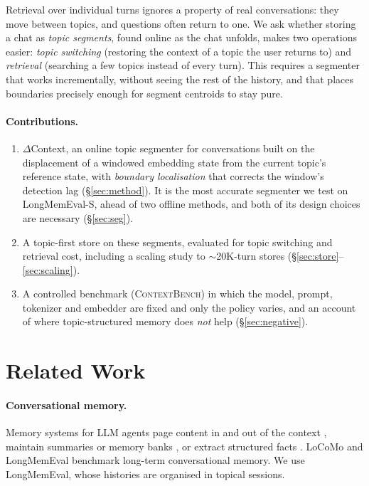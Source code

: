 \documentclass[11pt]{article}
\newcommand{\dc}{$\Delta$Context}
\begin{document}
Retrieval over individual turns ignores a property of real conversations: they
move between topics, and questions often return to one. We ask whether storing
a chat as \emph{topic segments}, found online as the chat unfolds, makes two
operations easier: \emph{topic switching} (restoring the context of a topic
the user returns to) and \emph{retrieval} (searching a few topics instead of
every turn). This requires a segmenter that works incrementally, without
seeing the rest of the history, and that places boundaries precisely enough
for segment centroids to stay pure.

\paragraph{Contributions.}
\begin{enumerate}
  \item \dc{}, an online topic segmenter for conversations built on the
  displacement of a windowed embedding state from the current topic's
  reference state, with \emph{boundary localisation} that corrects the window's
  detection lag (\S\ref{sec:method}). It is the most accurate segmenter we
  test on LongMemEval-S, ahead of two offline methods, and both of its design
  choices are necessary (\S\ref{sec:seg}).
  \item A topic-first store on these segments, evaluated for topic switching
  and retrieval cost, including a scaling study to $\sim$20K-turn stores
  (\S\ref{sec:store}--\ref{sec:scaling}).
  \item A controlled benchmark (\textsc{ContextBench}) in which the model,
  prompt, tokenizer and embedder are fixed and only the policy varies, and an
  account of where topic-structured memory does \emph{not} help
  (\S\ref{sec:negative}).
\end{enumerate}

\section{Related Work}

\paragraph{Conversational memory.} Memory systems for LLM agents page content
in and out of the context \citep{packer2023memgpt}, maintain summaries or
memory banks \citep{zhong2024memorybank,park2023generative}, or extract
structured facts \citep{chhikara2025mem0}. LoCoMo \citep{maharana2024locomo}
and LongMemEval \citep{wu2025longmemeval} benchmark long-term conversational
memory. We use LongMemEval, whose histories are organised in topical sessions.
\end{document}
